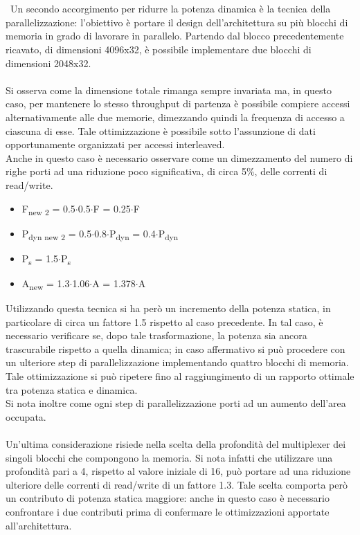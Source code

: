 \documentclass[11pt,  english, makeidx, a4paper, titlepage, oneside]{book}
\begin{document}
\\\\\
Un secondo accorgimento per ridurre la potenza dinamica è la tecnica della parallelizzazione: l'obiettivo è portare il design dell'architettura su più blocchi di memoria in grado di lavorare in parallelo. Partendo dal blocco precedentemente ricavato, di dimensioni 4096x32, è possibile implementare due blocchi di dimensioni 2048x32.
\\\\
Si osserva come la dimensione totale rimanga sempre invariata ma, in questo caso, per mantenere lo stesso throughput di partenza è possibile compiere accessi alternativamente alle due memorie, dimezzando quindi la frequenza di accesso a ciascuna di esse. Tale ottimizzazione è possibile sotto l'assunzione di dati opportunamente organizzati per accessi interleaved.
\\
Anche in questo caso è necessario osservare come un dimezzamento del numero di righe porti ad una riduzione poco significativa, di circa 5\%, delle correnti di read/write.
\\
\begin{itemize}
\item F\textsubscript{new 2} = 0.5$\cdot$0.5$\cdot$F = 0.25$\cdot$F
\item P\textsubscript{dyn new 2} = 0.5$\cdot$0.8$\cdot$P\textsubscript{dyn} = 0.4$\cdot$P\textsubscript{dyn}
\item P\textsubscript{s} = 1.5$\cdot$P\textsubscript{s}
\item A\textsubscript{new} = 1.3$\cdot$1.06$\cdot$A = 1.378$\cdot$A
\end{itemize}
\vspace{0.3cm}
Utilizzando questa tecnica si ha però un incremento della potenza statica, in particolare di circa un fattore 1.5 rispetto al caso precedente. In tal caso, è necessario verificare se, dopo tale trasformazione, la potenza sia ancora trascurabile rispetto a quella dinamica; in caso affermativo si può procedere con un ulteriore step di parallelizzazione implementando quattro blocchi di memoria. Tale ottimizzazione si può ripetere fino al raggiungimento di un rapporto ottimale tra potenza statica e dinamica.
\\
Si nota inoltre come ogni step di parallelizzazione porti ad un aumento dell'area occupata.
\\\\
Un'ultima considerazione risiede nella scelta della profondità del multiplexer dei singoli blocchi che compongono la memoria. Si nota infatti che utilizzare una profondità pari a 4, rispetto al valore iniziale di 16, può portare ad una riduzione ulteriore delle correnti di read/write di un fattore 1.3. Tale scelta comporta però un contributo di potenza statica maggiore: anche in questo caso è necessario confrontare i due contributi prima di confermare le ottimizzazioni apportate all'architettura.
\end{document}
